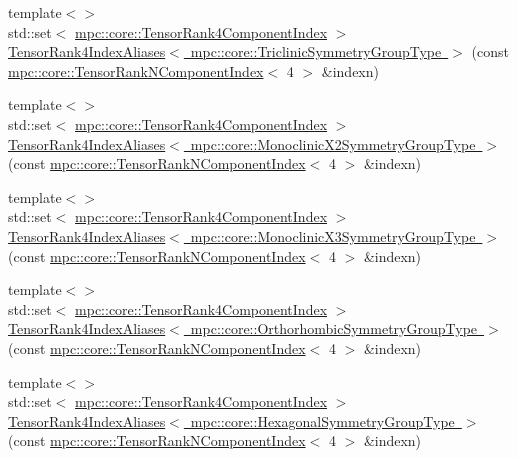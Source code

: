 \begin{DoxyCompactItemize}
\item 
{\footnotesize template$<$$>$ }\\std\+::set$<$ \mbox{\hyperlink{namespacempc_1_1core_a54c081f41b2475abd10182bf023805d2}{mpc\+::core\+::\+Tensor\+Rank4\+Component\+Index}} $>$ \mbox{\hyperlink{namespacempc_1_1core_a4ff433f9ec4bb5fc7b191316479e269d}{Tensor\+Rank4\+Index\+Aliases$<$ mpc\+::core\+::\+Triclinic\+Symmetry\+Group\+Type $>$}} (const \mbox{\hyperlink{classmpc_1_1core_1_1_tensor_rank_n_component_index}{mpc\+::core\+::\+Tensor\+Rank\+N\+Component\+Index}}$<$ 4 $>$ \&indexn)
\item 
{\footnotesize template$<$$>$ }\\std\+::set$<$ \mbox{\hyperlink{namespacempc_1_1core_a54c081f41b2475abd10182bf023805d2}{mpc\+::core\+::\+Tensor\+Rank4\+Component\+Index}} $>$ \mbox{\hyperlink{namespacempc_1_1core_a70b4f45b13d870d2640b00970b378441}{Tensor\+Rank4\+Index\+Aliases$<$ mpc\+::core\+::\+Monoclinic\+X2\+Symmetry\+Group\+Type $>$}} (const \mbox{\hyperlink{classmpc_1_1core_1_1_tensor_rank_n_component_index}{mpc\+::core\+::\+Tensor\+Rank\+N\+Component\+Index}}$<$ 4 $>$ \&indexn)
\item 
{\footnotesize template$<$$>$ }\\std\+::set$<$ \mbox{\hyperlink{namespacempc_1_1core_a54c081f41b2475abd10182bf023805d2}{mpc\+::core\+::\+Tensor\+Rank4\+Component\+Index}} $>$ \mbox{\hyperlink{namespacempc_1_1core_a0b052c1b16c1b0c03ca83be25dc26877}{Tensor\+Rank4\+Index\+Aliases$<$ mpc\+::core\+::\+Monoclinic\+X3\+Symmetry\+Group\+Type $>$}} (const \mbox{\hyperlink{classmpc_1_1core_1_1_tensor_rank_n_component_index}{mpc\+::core\+::\+Tensor\+Rank\+N\+Component\+Index}}$<$ 4 $>$ \&indexn)
\item 
{\footnotesize template$<$$>$ }\\std\+::set$<$ \mbox{\hyperlink{namespacempc_1_1core_a54c081f41b2475abd10182bf023805d2}{mpc\+::core\+::\+Tensor\+Rank4\+Component\+Index}} $>$ \mbox{\hyperlink{namespacempc_1_1core_a5eee0ad076390ff26c6f422026fea824}{Tensor\+Rank4\+Index\+Aliases$<$ mpc\+::core\+::\+Orthorhombic\+Symmetry\+Group\+Type $>$}} (const \mbox{\hyperlink{classmpc_1_1core_1_1_tensor_rank_n_component_index}{mpc\+::core\+::\+Tensor\+Rank\+N\+Component\+Index}}$<$ 4 $>$ \&indexn)
\item 
{\footnotesize template$<$$>$ }\\std\+::set$<$ \mbox{\hyperlink{namespacempc_1_1core_a54c081f41b2475abd10182bf023805d2}{mpc\+::core\+::\+Tensor\+Rank4\+Component\+Index}} $>$ \mbox{\hyperlink{namespacempc_1_1core_a10c87a52eecf7750cc80658d4ae62568}{Tensor\+Rank4\+Index\+Aliases$<$ mpc\+::core\+::\+Hexagonal\+Symmetry\+Group\+Type $>$}} (const \mbox{\hyperlink{classmpc_1_1core_1_1_tensor_rank_n_component_index}{mpc\+::core\+::\+Tensor\+Rank\+N\+Component\+Index}}$<$ 4 $>$ \&indexn)

\end{DoxyCompactItemize}
